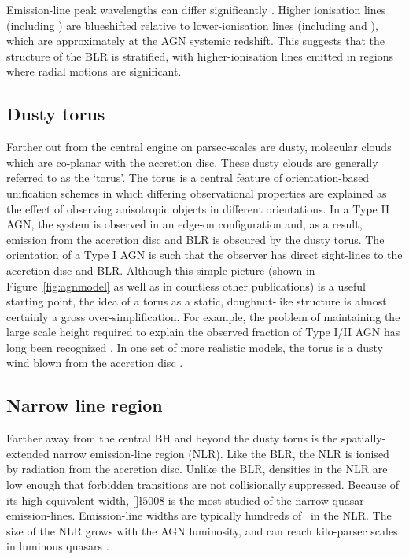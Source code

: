 Emission-line peak wavelengths can differ significantly \citep[e.g.][]{gaskell82}. 
Higher ionisation lines (including ) are blueshifted relative to lower-ionisation lines (including  and \hb), which are approximately at the AGN systemic redshift. 
This suggests that the structure of the BLR is stratified, with higher-ionisation lines emitted in regions where radial motions are significant.  

\subsection{Dusty torus}

Farther out from the central engine on parsec-scales are dusty, molecular clouds which are co-planar with the accretion disc. 
These dusty clouds are generally referred to as the `torus'. 
The torus is a central feature of orientation-based unification schemes \citep[e.g.][]{antonucci93} in which differing observational properties are explained as the effect of observing anisotropic objects in different orientations. 
In a Type II AGN, the system is observed in an edge-on configuration and, as a result, emission from the accretion disc and BLR is obscured by the dusty torus.
The orientation of a Type I AGN is such that the observer has direct sight-lines to the accretion disc and BLR. 
Although this simple picture (shown in Figure~\ref{fig:agnmodel} as well as in countless other publications) is a useful starting point, the idea of a torus as a static, doughnut-like structure is almost certainly a gross over-simplification. 
For example, the problem of maintaining the large scale height required to explain the observed fraction of Type I/II AGN has long been recognized \citep[e.g.][]{krolik88}. 
In one set of more realistic models, the torus is a dusty wind blown from the accretion disc \citep[e.g.][]{konigl94,everett09,gallagher12,everett05,keating12,elitzur06}. 

\subsection{Narrow line region}

Farther away from the central BH and beyond the dusty torus is the spatially-extended narrow emission-line region (NLR). 
Like the BLR, the NLR is ionised by radiation from the accretion disc. 
Unlike the BLR, densities in the NLR are low enough that forbidden transitions are not collisionally suppressed.
Because of its high equivalent width, []\l$5008$ is the most studied of the narrow quasar emission-lines.  
Emission-line widths are typically hundreds of \kms\, in the NLR.
The size of the NLR grows with the AGN luminosity, and can reach kilo-parsec scales in luminous quasars \citep[e.g.][]{hainline13}.    


